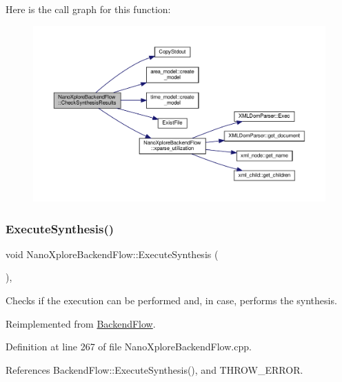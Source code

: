 Here is the call graph for this function\+:
\nopagebreak
\begin{figure}[H]
\begin{center}
\leavevmode
\includegraphics[width=350pt]{d3/d3c/classNanoXploreBackendFlow_ab62a47ac25b6bb973d3612feee8c14b3_cgraph}
\end{center}
\end{figure}
\mbox{\label{classNanoXploreBackendFlow_a068c9327512c0a9f5524433ebb52fde7}} 
\subsubsection{\texorpdfstring{Execute\+Synthesis()}{ExecuteSynthesis()}}
{\footnotesize\ttfamily void Nano\+Xplore\+Backend\+Flow\+::\+Execute\+Synthesis (\begin{DoxyParamCaption}{ }\end{DoxyParamCaption})\hspace{0.3cm}{\ttfamily [override]}, {\ttfamily [virtual]}}



Checks if the execution can be performed and, in case, performs the synthesis. 



Reimplemented from \hyperlink{classBackendFlow_af0e8f1973185540298eaa3ac4bee3b2c}{Backend\+Flow}.



Definition at line 267 of file Nano\+Xplore\+Backend\+Flow.\+cpp.



References Backend\+Flow\+::\+Execute\+Synthesis(), and T\+H\+R\+O\+W\+\_\+\+E\+R\+R\+OR.

